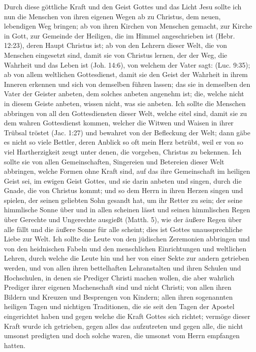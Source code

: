 Durch diese göttliche Kraft und den Geist Gottes und das
Licht Jesu sollte ich nun die Menschen von ihren eigenen Wegen
ab zu Christus, dem neuen, lebendigen Weg bringen; ab von
ihren Kirchen von Menschen gemacht, zur Kirche in Gott, zur
Gemeinde der Heiligen, die im Himmel angeschrieben ist 
(Hebr. 12:23),
deren Haupt Christus ist; ab von den Lehrern dieser Welt, die
von Menschen eingesetzt sind, damit sie von Christus lernen, der
der Weg, die Wahrheit und das Leben ist 
(Joh. 14:6), von welchem
der Vater sagt:  
(Luc. 9:35);
ab von allem weltlichen Gottesdienst, 
damit sie den Geist der 
Wahrheit in ihrem Inneren erkennen und sich von demselben führen
lassen; das sie in demselben den Vater der Geister anbeten, dem
solches anbeten angenehm ist; die, welche nicht in diesem Geiste
anbeten, wissen nicht, was sie anbeten. Ich sollte die Menschen
abbringen von all den Gottesdiensten dieser Welt, welche eitel
sind, damit sie zu dem wahren Gottesdienst kommen, welcher die
Witwen und Waisen in ihrer Trübsal tröstet 
(Jac. 1:27) und bewahret 
von der Befleckung der Welt; dann gäbe es nicht so viele
Bettler, deren Anblick so oft mein Herz betrübt, weil er von so
viel Hartherzigkeit zeugt unter denen, die vorgeben, Christus zu
bekennen. Ich sollte sie von allen 
Gemeinschaften, Singereien
und Betereien dieser Welt abbringen, 
welche Formen ohne Kraft
sind, auf das ihre Gemeinschaft im heiligen Geist sei, im ewigen
Geist Gottes, und sie darin anbeten und singen, durch die Gnade,
die von Christus kommt; und so dem Herrn in ihren Herzen
singen und spielen, der seinen geliebten Sohn gesandt hat, um
ihr Retter zu sein; der seine himmlische Sonne über und in allen
scheinen lässt und seinen himmlischen Regen über Gerechte und
Ungerechte ausgießt (Matth. 5), 
wie der äußere Regen über alle
fällt und die äußere Sonne für alle scheint; dies ist Gottes 
unaussprechliche Liebe zur Welt. Ich sollte die Leute von den
jüdischen Zeremonien abbringen und von 
den heidnischen Fabeln
und den menschlichen Einrichtungen und weltlichen Lehren, durch
welche die Leute hin und her von einer Sekte zur andern 
getrieben werden, und von allen ihren bettelhaften Lehranstalten
und ihren Schulen und Hochschulen, in denen sie Prediger Christi
machen wollen, die aber wahrlich Prediger ihrer eigenen 
Machenschaft sind und nicht Christi; von allen ihren Bildern und Kreuzen
und Besprengen von Kindern; allen ihren sogenannten heiligen
Tagen und nichtigen Traditionen, 
die sie seit den Tagen der
Apostel eingerichtet haben und gegen welche die Kraft Gottes
sich richtet; vermöge dieser Kraft wurde ich getrieben, gegen
alles das aufzutreten und gegen alle, die nicht umsonst 
predigten und doch solche waren, die 
umsonst vom Herrn  empfangen hatten. 

